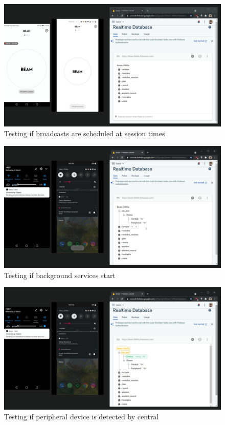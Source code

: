 \documentclass[../report.tex]{subfiles}
\begin{document}
\begin{figure}[H]
	\centering
	\includegraphics[width=.7\linewidth]{../images/07/02-app-test-alarm.jpg}
	\caption{Testing if broadcasts are scheduled at session times}
	\label{fig:app-test-alarm}
\end{figure} 

\begin{figure}[H]
	\centering
	\includegraphics[width=.7\linewidth]{../images/07/02-app-test-services-started.jpg}
	\caption{Testing if background services start}
	\label{fig:app-test-services}
\end{figure} 

\begin{figure}[H]
	\centering
	\includegraphics[width=.7\linewidth]{../images/07/02-app-test-devices-found.jpg}
	\caption{Testing if peripheral device is detected by central}
	\label{fig:app-test-devices-found}
\end{figure} 
\end{document}
